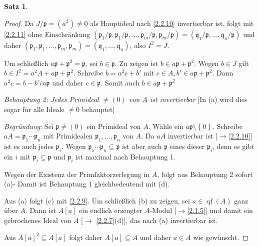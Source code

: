 \documentclass[
twoside=semi,
fontsize=12,
DIV=12, 
cleardoublepage=current,
leqno,
headings=optiontoheadandtoc, 
toc=idx
]{scrbook}
\newcommand{\set}[1]{\left\{ #1 \right\}}
\DeclareMathOperator{\qf}{qf}
\theoremstyle{definition}
\newtheorem{satz}[definition]{Satz}
\begin{document}
\begin{satz}
\begin{proof}
 			Da $J/\mathfrak{p} = (\overline{a}^2) \neq 0$ als Hauptideal nach \ref{2.2.10} invertierbar ist, folgt mit \ref{2.2.11} ohne Einschr\"ankung $(\mathfrak{p}_1/\mathfrak{p}, \mathfrak{p}_1/\mathfrak{p}, \dots, \mathfrak{p}_m/\mathfrak{p}, \mathfrak{p}_m/\mathfrak{p}) = (\mathfrak{q}_1/\mathfrak{p},\dots, \mathfrak{q}_n/\mathfrak{p})$  und daher 
 			$(\mathfrak{p}_1,\mathfrak{p}_1,\dots,\mathfrak{p}_m,\mathfrak{p}_m) = (\mathfrak{q}_1,\dots,\mathfrak{q}_n)$, also $I^2 = J$.
 			
 			Um schlie\ss lich $a\mathfrak{p} + \mathfrak{p}^2 = \mathfrak{p}$, sei $b \in \mathfrak{p}$. Zu zeigen ist $b \in a\mathfrak{p} + \mathfrak{p}^2$. Wegen $b \in J$ gilt $b \in I^2 = a^2A + a\mathfrak{p}+ \mathfrak{p}^2$. Schreibe $b = a^2c + b'$ mit $c \in A, b' \in a\mathfrak{p}+\mathfrak{p}^2$. Dann $a^2c = b - b' in \mathfrak{p}$ und daher $c \in \mathfrak{p}$. Somit auch $b \in a \mathfrak{p} + \mathfrak{p}^2$
 			
 			
 			\emph{Behauptung 2: Jedes Primideal $\neq (0)$ von $A$ ist invertierbar} [In (a) wird dies sogar f\"ur alle Ideale $\neq 0$ behauptet]
 			
 			\emph{Begr\"undung}: Sei $\mathfrak{p} \neq (0)$ ein Primideal von $A$. W\"ahle ein $a \mathfrak{p}\setminus \set{0}$. Schreibe $aA = \mathfrak{p}_1 \cdots \mathfrak{p}_n$ mit Primidealen $\mathfrak{p}_1,\dots, \mathfrak{p}_n$ von $A$. Da $aA$ invertierbar ist [$\to$\ref{2.2.10}] ist es auch jedes $\mathfrak{p}_i$. Wegen $\mathfrak{p}_1\cdots \mathfrak{p}_n \subseteq \mathfrak{p}$ ist aber auch $\mathfrak{p}$ eines dieser $\mathfrak{p}_i$, denn es gibt ein $i$ mit $\mathfrak{p}_i \subseteq \mathfrak{p}$ und $\mathfrak{p}_i$ ist maximal nach Behauptung 1.
 			
 			\vspace*{2mm}
 			
 			Wegen der Existenz der Primfaktorzerlegung in $A$, folgt aus Behauptung 2 sofort (a)- Damit ist Behauptung 1 gleichbedeutend mit (d). 
 			
 			Aus (a) folgt (c) mit \ref{2.2.9}. Um schlie\ss lich (b) zu zeigen, sei $a \in \qf(A)$ ganz \"uber $A$. Dann ist $A[a]$ ein endlich erzeugter $A$-Modul [$\to$\ref{2.1.5}] und damit ein gebrochenes Ideal von $A$ [$\to$ \ref{2.2.7}(d)], das nach (a) invertierbar ist. 
 			
 			Aus $A[a]^2 \subseteq A[a]$ folgt daher $A[a] \subseteq A$ und daher $a \in A$ wie gew\"unscht.
   		\end{proof}
   	 \end{satz}
   	\newpage
   		
\end{document}
